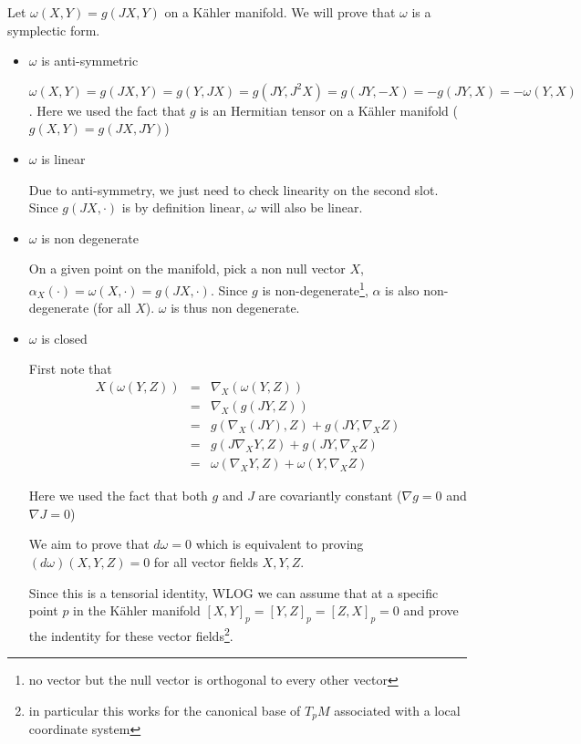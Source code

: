 \documentclass[12pt]{article}
\begin{document}
Let $\omega(X,Y) = g(JX,Y)$ on a K\"ahler manifold. We will prove that $\omega$ is a symplectic form.

\begin{itemize}

\item $\omega$ is anti-symmetric

$\omega(X,Y) = g(JX,Y) = g(Y,JX) = g(JY, J^2 X) = g(JY,-X) = -g(JY,X) = -\omega(Y,X)$. Here we used the fact that $g$ is an Hermitian tensor on a K\"ahler manifold ($g(X,Y) = g(JX, JY)$)

\item $\omega$ is linear

Due to anti-symmetry, we just need to check linearity on the second slot. Since $g(JX,\cdot)$ is by definition linear, $\omega$ will also be linear.

\item $\omega$ is non degenerate

On a given point on the manifold, pick a non null vector $X$, $\alpha_X(\cdot) = \omega(X, \cdot ) = g(JX, \cdot)$. Since $g$ is non-degenerate\footnote{no vector but the null vector is orthogonal to every other vector}, $\alpha$ is also non-degenerate (for all $X$). $\omega$ is thus non degenerate.

\item $\omega$ is closed

First note that 
\begin{eqnarray}
X(\omega(Y,Z)) &=& \nabla_X (\omega(Y,Z)) \nonumber \\
 &=& \nabla_X (g(JY,Z)) \nonumber \\
 &=& g(\nabla_X(JY),Z) + g(JY, \nabla_X Z) \nonumber \\
 &=& g(J\nabla_X Y, Z) + g(JY, \nabla_X Z) \nonumber \\
 &=& \omega(\nabla_X Y, Z) + \omega(Y, \nabla_X Z) \nonumber
\end{eqnarray}

Here we used the fact that both $g$ and $J$ are covariantly constant ($\nabla g = 0$ and $\nabla J = 0$)

We aim to prove that $d \omega = 0$ which is equivalent to proving $(d \omega)(X,Y,Z) = 0$ for all vector fields $X,Y,Z$.

Since this is a tensorial identity, WLOG we can assume that at a specific point $p$ in the K\"ahler manifold $[X,Y]_p = [Y,Z]_p = [Z,X]_p =0$ and prove the indentity for these vector fields\footnote{in particular this works for the canonical base of $T_p M$ associated with a local coordinate system}.


\end{itemize}
\end{document}

